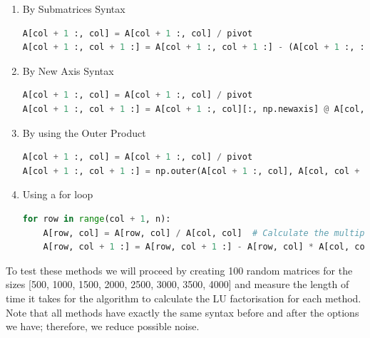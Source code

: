 \begin{enumerate}
    \item By Submatrices Syntax
    \begin{lstlisting}[language=Python]
A[col + 1 :, col] = A[col + 1 :, col] / pivot
A[col + 1 :, col + 1 :] = A[col + 1 :, col + 1 :] - (A[col + 1 :, :][:, [col]] @ A[[col], :][:, col + 1 :])
    \end{lstlisting}

    \item By New Axis Syntax
    \begin{lstlisting}[language=Python]
A[col + 1 :, col] = A[col + 1 :, col] / pivot
A[col + 1 :, col + 1 :] = A[col + 1 :, col][:, np.newaxis] @ A[col, col + 1 :][np.newaxis, :]
    \end{lstlisting}

    \item By using the Outer Product
    \begin{lstlisting}[language=Python]
A[col + 1 :, col] = A[col + 1 :, col] / pivot
A[col + 1 :, col + 1 :] = np.outer(A[col + 1 :, col], A[col, col + 1 :])
    \end{lstlisting}

    \item Using a for loop
    \begin{lstlisting}[language=Python]
for row in range(col + 1, n):
    A[row, col] = A[row, col] / A[col, col]  # Calculate the multiplier and store in A for later use
    A[row, col + 1 :] = A[row, col + 1 :] - A[row, col] * A[col, col + 1 :]  # Update the remaining elements in the row using the multiplier
    \end{lstlisting} 
\end{enumerate}

To test these methods we will proceed by creating 100 random matrices for the sizes [500, 1000, 1500, 2000, 2500, 3000, 3500, 4000] and measure the length of time it takes for the algorithm to calculate the LU factorisation for each method. Note that all methods have exactly the same syntax before and after the options we have; therefore, we reduce possible noise.
